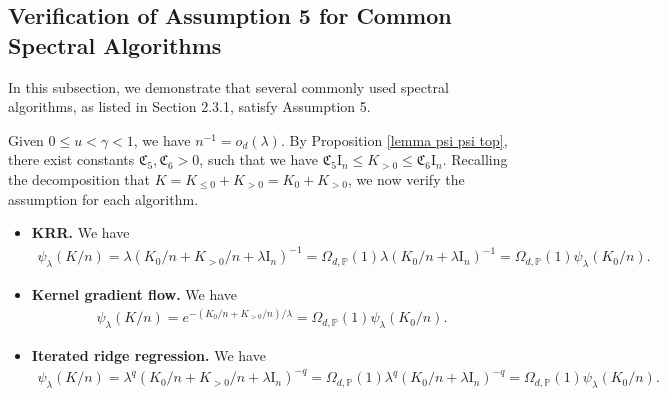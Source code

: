 \documentclass{article}
\theoremstyle{plain}
\theoremstyle{definition}
\theoremstyle{remark}
\newcommand{\rem}{\psi_\lambda}
\begin{document}
\begin{appendix}
\subsection{Verification of Assumption 5 for Common Spectral Algorithms}\label{appendix_verify_assump_filter}

In this subsection, we demonstrate that several commonly used spectral algorithms, as listed in Section 2.3.1, satisfy Assumption 5.

Given $0 \leq u < \gamma <1$, we have $n^{-1}=o_d(\lambda)$. By Proposition \ref{lemma psi psi top}, there exist constants $\mathfrak{C}_5, \mathfrak{C}_6 >0$, such that we have $\mathfrak{C}_5 \mathrm{I}_n \leq K_{>0} \leq \mathfrak{C}_6 \mathrm{I}_n$. Recalling the decomposition that $K = K_{\leq 0} + K_{>0} = K_{0} + K_{>0}$, we now verify the assumption for each algorithm. 

\begin{itemize}
    \item {\bf KRR.} We have
    \begin{equation*}
    \begin{aligned}
        \rem(K/n) = \lambda (K_{0}/n + K_{> 0}/n + \lambda \mathrm{I}_n)^{-1} 
        =\Omega_{d, \mathbb{P}}(1)\lambda (K_{0}/n  + \lambda \mathrm{I}_n)^{-1}
        = \Omega_{d, \mathbb{P}}(1)\rem(K_{0}/n).
    \end{aligned}
\end{equation*}


    \item {\bf Kernel gradient flow.} We have
    \begin{equation*}
    \begin{aligned}
        \rem(K/n) = e^{- (K_{0}/n + K_{> 0}/n)/\lambda} 
        = \Omega_{d, \mathbb{P}}(1)\rem(K_{0}/n).
    \end{aligned}
\end{equation*}

\item {\bf Iterated ridge regression.} We have
\begin{equation*}
    \begin{aligned}
        \rem(K/n) = \lambda^{q} (K_{0}/n + K_{> 0}/n + \lambda \mathrm{I}_n)^{-q} 
        =\Omega_{d, \mathbb{P}}(1)\lambda^{q} (K_{0}/n  + \lambda \mathrm{I}_n)^{-q}
        = \Omega_{d, \mathbb{P}}(1)\rem(K_{0}/n).
    \end{aligned}
\end{equation*}


\end{itemize}
\end{appendix}
\end{document}
